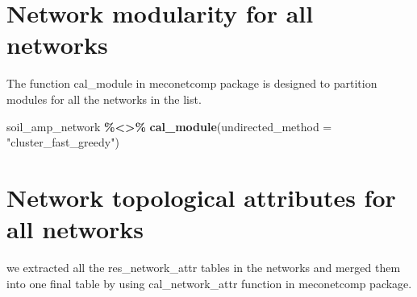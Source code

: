 \documentclass[
]{book}
\newenvironment{Shaded}{\begin{snugshade}}{\end{snugshade}}
\newcommand{\AttributeTok}[1]{\textcolor[rgb]{0.13,0.29,0.53}{#1}}
\newcommand{\CommentTok}[1]{\textcolor[rgb]{0.56,0.35,0.01}{\textit{#1}}}
\newcommand{\FloatTok}[1]{\textcolor[rgb]{0.00,0.00,0.81}{#1}}
\newcommand{\FunctionTok}[1]{\textcolor[rgb]{0.13,0.29,0.53}{\textbf{#1}}}
\newcommand{\NormalTok}[1]{#1}
\newcommand{\OtherTok}[1]{\textcolor[rgb]{0.56,0.35,0.01}{#1}}
\newcommand{\SpecialCharTok}[1]{\textcolor[rgb]{0.81,0.36,0.00}{\textbf{#1}}}
\newcommand{\StringTok}[1]{\textcolor[rgb]{0.31,0.60,0.02}{#1}}
\begin{document}
\begin{Shaded}
\end{Shaded}

\section{Network modularity for all networks}\label{network-modularity-for-all-networks}

The function cal\_module in meconetcomp package is designed to partition modules for all the networks in the list.

\begin{Shaded}
\begin{Highlighting}[]
\NormalTok{soil\_amp\_network }\SpecialCharTok{\%\textless{}\textgreater{}\%} \FunctionTok{cal\_module}\NormalTok{(}\AttributeTok{undirected\_method =} \StringTok{"cluster\_fast\_greedy"}\NormalTok{)}
\end{Highlighting}
\end{Shaded}

\section{Network topological attributes for all networks}\label{network-topological-attributes-for-all-networks}

we extracted all the res\_network\_attr tables in the networks and merged them into one final table by using cal\_network\_attr function in meconetcomp package.
\end{document}
